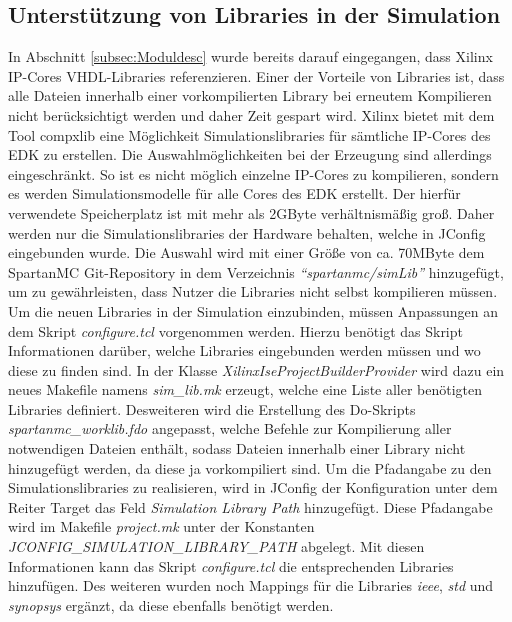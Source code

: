 \subsection{Unterstützung von Libraries in der Simulation}
In Abschnitt \ref{subsec:Moduldesc} wurde bereits darauf eingegangen, dass Xilinx IP-Cores VHDL-Libraries referenzieren. Einer der Vorteile von Libraries ist, dass alle Dateien innerhalb einer vorkompilierten Library bei erneutem Kompilieren nicht berücksichtigt werden und daher Zeit gespart wird. Xilinx bietet mit dem Tool compxlib eine Möglichkeit Simulationslibraries für sämtliche IP-Cores des EDK zu erstellen. Die Auswahlmöglichkeiten bei der Erzeugung sind allerdings eingeschränkt. So ist es nicht möglich einzelne IP-Cores zu kompilieren, sondern es werden Simulationsmodelle für alle Cores des EDK erstellt. Der hierfür verwendete Speicherplatz ist mit mehr als 2GByte verhältnismäßig groß. Daher werden nur die Simulationslibraries der Hardware behalten, welche in JConfig eingebunden wurde. Die Auswahl wird mit einer Größe von ca. 70MByte dem SpartanMC Git-Repository in dem Verzeichnis \textit{``spartanmc/simLib''} hinzugefügt, um zu gewährleisten, dass Nutzer die Libraries nicht selbst kompilieren müssen.\\
Um die neuen Libraries in der Simulation einzubinden, müssen Anpassungen an dem Skript \textit{configure.tcl} vorgenommen werden. Hierzu benötigt das Skript Informationen darüber, welche Libraries eingebunden werden müssen und wo diese zu finden sind. In der Klasse \textit{XilinxIseProjectBuilderProvider} wird dazu ein neues Makefile namens \textit{sim\_lib.mk} erzeugt, welche eine Liste aller benötigten Libraries definiert. Desweiteren wird die Erstellung des Do-Skripts \textit{spartanmc\_worklib.fdo} angepasst, welche Befehle zur Kompilierung aller notwendigen Dateien enthält, sodass Dateien innerhalb einer Library nicht hinzugefügt werden, da diese ja vorkompiliert sind. Um die Pfadangabe zu den Simulationslibraries zu realisieren, wird in JConfig der Konfiguration unter dem Reiter Target das Feld \textit{Simulation Library Path} hinzugefügt. Diese Pfadangabe wird im Makefile \textit{project.mk} unter der Konstanten \textit{JCONFIG\_SIMULATION\_LIBRARY\_PATH} abgelegt. Mit diesen Informationen kann das Skript \textit{configure.tcl} die entsprechenden Libraries hinzufügen. Des weiteren wurden noch Mappings für die Libraries \textit{ieee}, \textit{std} und \textit{synopsys} ergänzt, da diese ebenfalls benötigt werden.
